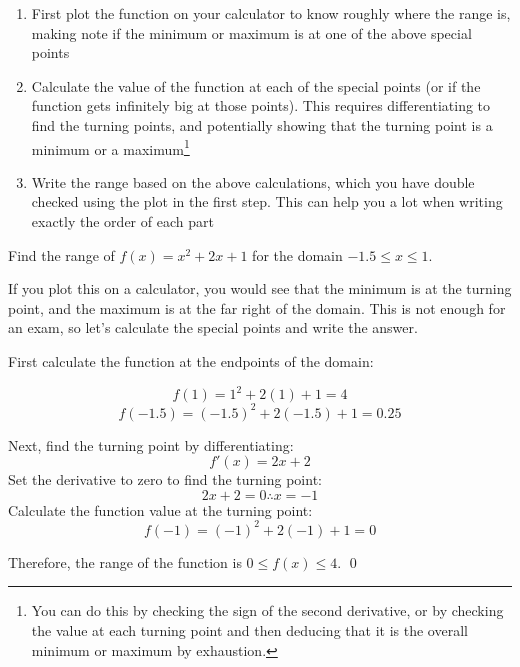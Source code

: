 \begin{enumerate}
    \item First plot the function on your calculator to know roughly where the range is, making note if the minimum or maximum is at one of the above special points
    \item Calculate the value of the function at each of the special points (or if the function gets infinitely big at those points). This requires differentiating to find the turning points, and potentially showing that the turning point is a minimum or a maximum\footnote{You can do this by checking the sign of the second derivative, or by checking the value at each turning point and then deducing that it is the overall minimum or maximum by exhaustion.} 
    \item Write the range based on the above calculations, which you have double checked using the plot in the first step. This can help you a lot when writing exactly the order of each part
\end{enumerate}

\begin{example}
    Find the range of $f(x) = x^2 + 2x + 1$ for the domain $-1.5 \leq x \leq 1$.
\end{example}
\begin{solution}
    If you plot this on a calculator, you would see that the minimum is at the turning point, and the maximum is at the far right of the domain. This is not enough for an exam, so let's calculate the special points and write the answer.

    First calculate the function at the endpoints of the domain:

    \[f(1) = 1^2 + 2(1) + 1 = 4\]
    \[f(-1.5) = (-1.5)^2 + 2(-1.5) + 1 = 0.25\]

    Next, find the turning point by differentiating:
    \[f'(x) = 2x + 2\]
    Set the derivative to zero to find the turning point:
    \[2x + 2 = 0 \therefore x = -1\]
    Calculate the function value at the turning point:
    \[f(-1) = (-1)^2 + 2(-1) + 1 = 0\]

    Therefore, the range of the function is $0 \leq f(x) \leq 4$.
    \qed
\end{solution}


